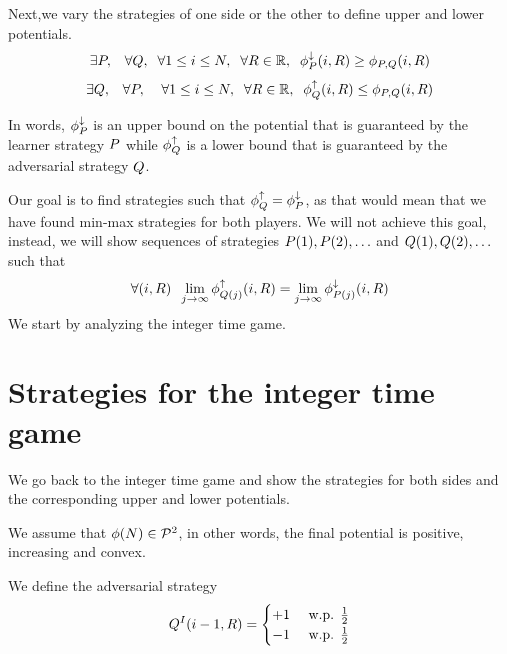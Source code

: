 \documentclass{article}[12pt]
\begin{document}
Next,we vary the strategies of one side or the other to define upper
and lower potentials.
\begin{equation} \label{eqn:upperPotentials}
  \exists P, \;\;\; \forall Q,\;\; \forall 1\leq i \leq
  N,\;\; \forall R \in \mathbb{R},\;\; \phi_{P}^{\downarrow}(i,R) \geq \phi_{P,Q}(i,R)
\end{equation}
\begin{equation} \label{eqn:lowerPotentials}
  \exists Q, \;\;\; \forall P, \;\; \;\; \forall 1\leq i \leq
  N,\;\; \forall R \in \mathbb{R},\;\; \phi_{Q}^{\uparrow}(i,R) \leq \phi_{P,Q}(i,R)
\end{equation}

In words, $\phi_{P}^{\downarrow}$ is an upper bound on the potential that is 
guaranteed by the learner strategy $P$ while $\phi_{Q}^{\uparrow}$
is a lower bound that is guaranteed by the adversarial
strategy $Q$.

Our goal is to find strategies such that $\phi_{Q}^{\uparrow} = \phi_{P}^{\downarrow}$, as
that would mean that we have found min-max strategies for both
players. We will not achieve this goal, instead, we will show
sequences of strategies $P(1),P(2),\ldots$ and
$Q(1),Q(2),\ldots$ such that
\begin{equation} \label{eqn:limitPotential}
\forall (i,R)\;\;\lim_{j \to \infty}\phi_{Q(j)}^{\uparrow}(i,R) = \lim_{j \to
  \infty} \phi_{P(j)}^{\downarrow}(i,R)
\end{equation}
We  start by analyzing the integer time game. 


\section{Strategies for the integer time  game} \label{sec:strat-integer}

We go back to the integer time game and show the strategies for both
sides and the corresponding upper and lower potentials.

We assume that $\phi(N)  \in {\cal P}^{2}$, in other words, the final
potential is positive, increasing and convex.

We define the adversarial strategy
\begin{equation} \label{eqn:adv-strat-p}
  Q^I(i-1,R) =
  \begin{cases}
    +1 & \mbox{ w.p. } \frac{1}{2}\\
    -1 & \mbox{ w.p. } \frac{1}{2}\\
  \end{cases}
\end{equation}
\end{document}
